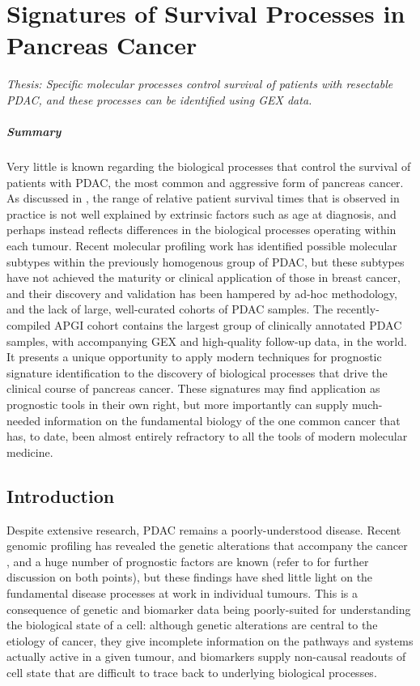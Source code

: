 \documentclass[dissertation.tex]{subfiles}
\begin{document}
\chapter{Signatures of Survival Processes in Pancreas Cancer}
\label{chap:signatures}

\emph{Thesis: Specific molecular processes control survival of patients with resectable \acrlong{PDAC}, and  these processes can be identified using \acrlong{GEX} data.}

\paragraph{Summary}Very little is known regarding the biological processes that control the survival of patients with \gls{PDAC}, the most common and aggressive form of pancreas cancer.  As discussed in , the range of relative patient survival times that is observed in practice is not well explained by extrinsic factors such as age at diagnosis, and perhaps instead reflects differences in the biological processes operating within each tumour.  Recent molecular profiling work \cite{Collisson2011} has identified possible molecular subtypes within the previously homogenous group of \gls{PDAC}, but these subtypes have not achieved the maturity or clinical application of those in breast cancer, and their discovery and validation has been hampered by ad-hoc methodology, and the lack of large, well-curated cohorts of \gls{PDAC} samples.  The recently-compiled \gls{APGI} cohort contains the largest group of clinically annotated \gls{PDAC} samples, with accompanying \gls{GEX} and high-quality follow-up data, in the world.  It presents a unique opportunity to apply modern techniques for prognostic signature identification to the discovery of biological processes that drive the clinical course of pancreas cancer.  These signatures may find application as prognostic tools in their own right, but more importantly can supply much-needed information on the fundamental biology of the one common cancer that has, to date, been almost entirely refractory to all the tools of modern molecular medicine.

\section{Introduction}
Despite extensive research, \gls{PDAC} remains a poorly-understood disease.  Recent genomic profiling has revealed the genetic alterations that accompany the cancer \cite{Biankin2012}, and a huge number of prognostic factors are known \cite{Harsha2009} (refer to  for further discussion on both points), but these findings have shed little light on the fundamental disease processes at work in individual tumours.  This is a consequence of genetic and biomarker data being poorly-suited for understanding the biological state of a cell: although genetic alterations are central to the etiology of cancer, they give incomplete information on the pathways and systems actually active in a given tumour, and biomarkers supply non-causal readouts of cell state that are difficult to trace back to underlying biological processes.
\end{document}
